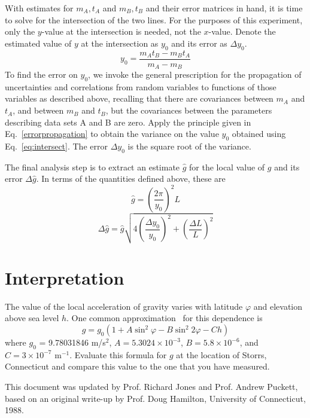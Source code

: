 \documentclass{revtex4}
\begin{document}
With estimates for $m_A,t_A$ and $m_B,t_B$ and their error matrices in hand,
it is time to solve for the intersection of the two lines.  For the purposes
of this experiment, only the $y$-value at the intersection is needed, not the
$x$-value. Denote the estimated value of $y$ at the intersection as $y_0$ and its error as $\Delta y_0$.
\begin{equation}
y_0 = \frac{m_At_B-m_Bt_A}{m_A-m_B} \label{eq:intersect}
\end{equation}
To find the error on $y_0$, we invoke the general prescription for the propagation of uncertainties and correlations from random variables to functions of those variables as described above, recalling that there are covariances between $m_A$ and $t_A$, and between
$m_B$ and $t_B$, but the covariances between the parameters describing data sets A and B are zero.
Apply the principle given in Eq.~\ref{errorpropagation} to obtain the variance on the value $y_0$ obtained using
Eq.~\ref{eq:intersect}. The error $\Delta y_0$ is the square root of
the variance.

The final analysis step is to extract an estimate $\hat{g}$ for the local
value of $g$ and its error $\Delta \hat{g}$.  In terms of the quantities
defined above, these are
\begin{equation}
\hat{g} = \left(\frac{2\pi}{y_0}\right)^2L
\end{equation}
\begin{equation}
\Delta \hat{g} = \hat{g}\sqrt{4\left(\frac{\Delta y_0}{y_0}\right)^2
+\left(\frac{\Delta L}{L}\right)^2}
\end{equation}

\section{Interpretation}
The value of the local acceleration of gravity varies with
latitude $\varphi$ and elevation above sea level $h$.  One common
approximation~\cite{Heiskanen67,Geodesy71} for this dependence is
\begin{equation}
g = g_0\left(1 + A\sin^2{\varphi} - B\sin^2{2\varphi} - Ch\right)
\end{equation}
where $g_0$ = 9.78031846 m/s$^2$, $A = 5.3024\times 10^{-3}$, 
$B = 5.8\times 10^{-6}$, and $C = 3\times 10^{-7}$ m$^{-1}$.
Evaluate this formula for $g$ at the location of Storrs, Connecticut and
compare this value to the one that you have measured.

\begin{acknowledgments}
This document was updated by Prof. Richard Jones and Prof. Andrew Puckett, based on an original 
write-up by Prof. Doug Hamilton, University of Connecticut, 1988.
\end{acknowledgments}
\end{document}
